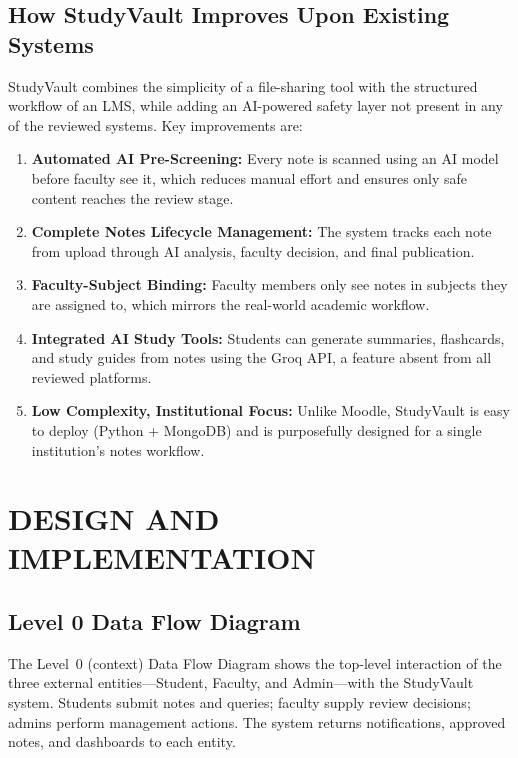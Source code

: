 \documentclass{sgcproject}
\begin{document}
\section{How StudyVault Improves Upon Existing Systems}

StudyVault combines the simplicity of a file-sharing tool with the structured workflow of an LMS, while adding an AI-powered safety layer not present in any of the reviewed systems. Key improvements are:

\begin{enumerate}
    \item \textbf{Automated AI Pre-Screening:} Every note is scanned using an AI model before faculty see it, which reduces manual effort and ensures only safe content reaches the review stage.
    \item \textbf{Complete Notes Lifecycle Management:} The system tracks each note from upload through AI analysis, faculty decision, and final publication.
    \item \textbf{Faculty-Subject Binding:} Faculty members only see notes in subjects they are assigned to, which mirrors the real-world academic workflow.
    \item \textbf{Integrated AI Study Tools:} Students can generate summaries, flashcards, and study guides from notes using the Groq API, a feature absent from all reviewed platforms.
    \item \textbf{Low Complexity, Institutional Focus:} Unlike Moodle, StudyVault is easy to deploy (Python + MongoDB) and is purposefully designed for a single institution's notes workflow.
\end{enumerate}

\chapter{DESIGN AND IMPLEMENTATION}

\section{Level 0 Data Flow Diagram}

The Level~0 (context) Data Flow Diagram shows the top-level interaction of the three external entities---Student, Faculty, and Admin---with the StudyVault system. Students submit notes and queries; faculty supply review decisions; admins perform management actions. The system returns notifications, approved notes, and dashboards to each entity.
\end{document}
